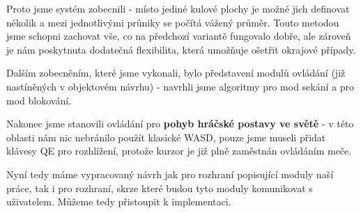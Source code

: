 Proto jsme systém zobecnili - místo jediné kulové plochy je možné jich definovat několik a mezi jednotlivými průniky se počítá vážený průměr. Touto metodou jsme schopni zachovat vše, co na předchozí variantě fungovalo dobře, ale zároveň je nám poskytnuta dodatečná flexibilita, která umožňuje ošetřit okrajové případy.

Dalším zobecněním, které jsme vykonali, bylo představení modulů ovládání (již nastíněných v objektovém návrhu) - navrhli jsme algoritmy pro mod sekání a pro mod blokování.

Nakonec jsme stanovili ovládání pro \textbf{pohyb hráčské postavy ve světě} - v této oblasti nám nic nebránilo použít klasické WASD, pouze jsme museli přidat klávesy QE pro rozhlížení, protože kurzor je již plně zaměstnán ovládáním meče.

\bigbreak
Nyní tedy máme vypracovaný návrh jak pro rozhraní popisující moduly naší práce, tak i pro rozhraní, skrze které budou tyto moduly komunikovat s uživatelem. Můžeme tedy přistoupit k implementaci.
